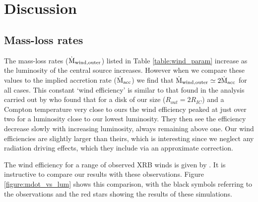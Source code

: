 \documentclass[a4paper,fleqn,usenatbib]{mnras}
\begin{document}
\section{Discussion}
\label{section:discussion}


\subsection{Mass-loss rates}

The mass-loss rates ($\dot{\rm{M}}_{\rm{wind,outer}}$) listed in Table \ref{table:wind_param}  
increase as the luminosity of the central source increases. However when we  compare these values to the implied
accretion rate ($\dot{\rm{M}}_{\rm{acc}}$) we find that $\dot{\rm{M}}_{\rm{wind,outer}}\simeq2\dot{\rm{M}}_{\rm{acc}}$
for all cases.
This constant `wind efficiency' is similar to that found in the analysis carried out by \cite{2018MNRAS.473..838D}
who found that for a disk of our size ($R_{out}=2R_{IC}$) and a Compton temperature
very close to ours the wind efficiency peaked at just over two for a luminosity close to our lowest luminosity.
They then see the efficiency decrease slowly with increasing luminosity, 
always remaining above one. Our wind efficiencies are slightly larger than theirs, which is interesting since
we neglect any radiation driving effects, which they include via an approximate correction. 

The wind efficiency for a range of observed XRB winds is given by \cite{2012MNRAS.422L..11P}.
It is instructive to compare our results with these observations. Figure \ref{figure:mdot_vs_lum} shows 
this comparison, with the black symbols referring to the observations and the red stars showing the
results of these simulations. 
\end{document}
